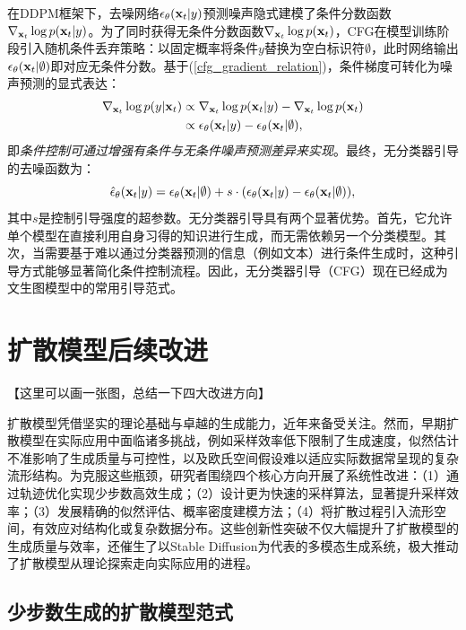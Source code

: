 \documentclass[11pt,a4paper,UTF8]{ctexart}
\begin{document}
在DDPM框架下，去噪网络$\epsilon_\theta(\mathbf{x}_t|y)$预测噪声隐式建模了条件分数函数$\nabla_{\mathbf{x}_t}\log p(\mathbf{x}_t|y)$。为了同时获得无条件分数函数$\nabla_{\mathbf{x}_t}\log p(\mathbf{x}_t)$，CFG在模型训练阶段引入随机条件丢弃策略：以固定概率将条件$y$替换为空白标识符$\emptyset$，此时网络输出$\epsilon_\theta(\mathbf{x}_t|\emptyset)$即对应无条件分数。基于(\ref{cfg_gradient_relation})，条件梯度可转化为噪声预测的显式表达：
\begin{align*}
    \nabla_{\mathbf{x}_t}\log p(y|\mathbf{x}_t) & \propto \nabla_{\mathbf{x}_t}\log p(\mathbf{x}_t|y) -\nabla_{\mathbf{x}_t}\log p(\mathbf{x}_t) \\
    &\propto \epsilon_\theta(\mathbf{x}_t|y) - \epsilon_\theta(\mathbf{x}_t|\emptyset),
\end{align*}
即\emph{条件控制可通过增强有条件与无条件噪声预测差异来实现}。最终，无分类器引导的去噪函数为：
\begin{equation}
    \hat{\epsilon}_\theta(\mathbf{x}_t|y) = \epsilon_\theta(\mathbf{x}_t|\emptyset) + s\cdot(\epsilon_\theta(\mathbf{x}_t|y) - \epsilon_\theta(\mathbf{x}_t|\emptyset)),
\label{conditional_classifier_free_guided}
\end{equation}
其中$s$是控制引导强度的超参数。无分类器引导具有两个显著优势。首先，它允许单个模型在直接利用自身习得的知识进行生成，而无需依赖另一个分类模型。其次，当需要基于难以通过分类器预测的信息（例如文本）进行条件生成时，这种引导方式能够显著简化条件控制流程。因此，无分类器引导（CFG）现在已经成为文生图模型中的常用引导范式。



\newpage

\section{扩散模型后续改进}

【这里可以画一张图，总结一下四大改进方向】

扩散模型凭借坚实的理论基础与卓越的生成能力，近年来备受关注。然而，早期扩散模型在实际应用中面临诸多挑战，例如采样效率低下限制了生成速度，似然估计不准影响了生成质量与可控性，以及欧氏空间假设难以适应实际数据常呈现的复杂流形结构。为克服这些瓶颈，研究者围绕四个核心方向开展了系统性改进：（1）通过轨迹优化实现少步数高效生成；（2）设计更为快速的采样算法，显著提升采样效率；（3）发展精确的似然评估、概率密度建模方法；（4）将扩散过程引入流形空间，有效应对结构化或复杂数据分布。这些创新性突破不仅大幅提升了扩散模型的生成质量与效率，还催生了以Stable Diffusion\cite{rombach2022high}为代表的多模态生成系统，极大推动了扩散模型从理论探索走向实际应用的进程。

\subsection{少步数生成的扩散模型范式}
\label{sec:rf_cm_lcm}
\end{document}
